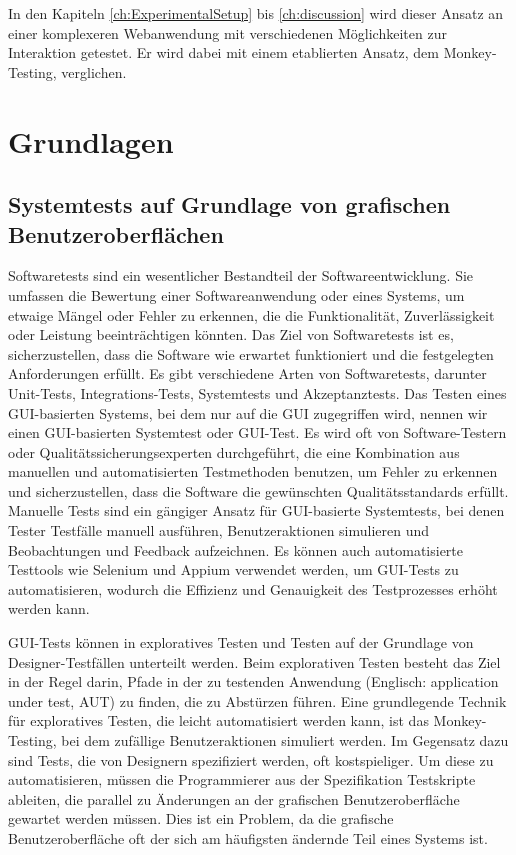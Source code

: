 In den Kapiteln \ref{ch:ExperimentalSetup} bis \ref{ch:discussion} wird dieser Ansatz an einer komplexeren Webanwendung mit verschiedenen Möglichkeiten zur Interaktion getestet.
Er wird dabei mit einem etablierten Ansatz, dem Monkey-Testing, verglichen.



\chapter{Grundlagen}
\label{ch:Foundations}

\section{Systemtests auf Grundlage von grafischen Benutzeroberflächen}
\label{sec:Foundations:GUIBasedSystemTests}
Softwaretests sind ein wesentlicher Bestandteil der Softwareentwicklung.
Sie umfassen die Bewertung einer Softwareanwendung oder eines Systems, um etwaige Mängel oder Fehler zu erkennen, die die Funktionalität, Zuverlässigkeit oder Leistung beeinträchtigen könnten.
Das Ziel von Softwaretests ist es, sicherzustellen, dass die Software wie erwartet funktioniert und die festgelegten Anforderungen erfüllt.
Es gibt verschiedene Arten von Softwaretests, darunter Unit-Tests, Integrations-Tests, Systemtests und Akzeptanztests.
Das Testen eines GUI-basierten Systems, bei dem nur auf die GUI zugegriffen wird, nennen wir einen GUI-basierten Systemtest oder GUI-Test.
Es wird oft von Software-Testern oder Qualitätssicherungsexperten durchgeführt, die eine Kombination aus manuellen und automatisierten Testmethoden benutzen, um Fehler zu erkennen und sicherzustellen, dass die Software die gewünschten Qualitätsstandards erfüllt.
Manuelle Tests sind ein gängiger Ansatz für GUI-basierte Systemtests, bei denen Tester Testfälle manuell ausführen, Benutzeraktionen simulieren und Beobachtungen und Feedback aufzeichnen.
Es können auch automatisierte Testtools wie Selenium und Appium verwendet werden, um GUI-Tests zu automatisieren, wodurch die Effizienz und Genauigkeit des Testprozesses erhöht werden kann.

GUI-Tests können in exploratives Testen und Testen auf der Grundlage von Designer-Testfällen unterteilt werden.
Beim explorativen Testen besteht das Ziel in der Regel darin, Pfade in der zu testenden Anwendung (Englisch: \foreignlanguage{english}{application under test}, AUT) zu finden, die zu Abstürzen führen.
Eine grundlegende Technik für exploratives Testen, die leicht automatisiert werden kann, ist das Monkey-Testing, bei dem zufällige Benutzeraktionen simuliert werden.
Im Gegensatz dazu sind Tests, die von Designern spezifiziert werden, oft kostspieliger.
Um diese zu automatisieren, müssen die Programmierer aus der Spezifikation Testskripte ableiten, die parallel zu Änderungen an der grafischen Benutzeroberfläche gewartet werden müssen.
Dies ist ein Problem, da die grafische Benutzeroberfläche oft der sich am häufigsten ändernde Teil eines Systems ist.

